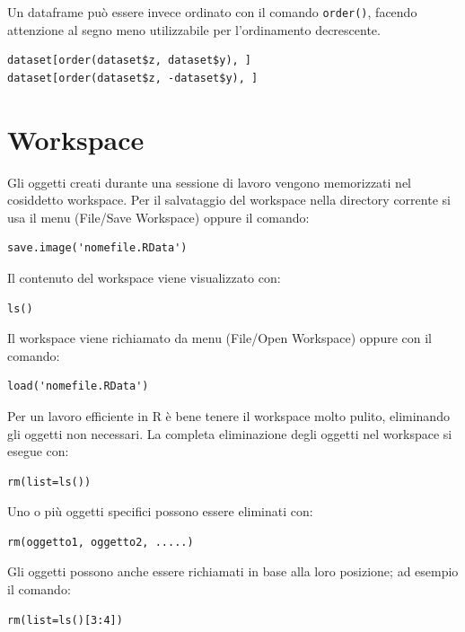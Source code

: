 \documentclass[a4paper,12pt,oneside]{book}
\begin{document}
Un dataframe può essere invece ordinato con il comando \texttt{order()}, facendo attenzione al segno meno utilizzabile per l'ordinamento decrescente.

\begin{verbatim}
dataset[order(dataset$z, dataset$y), ]
dataset[order(dataset$z, -dataset$y), ]
\end{verbatim}

\hypertarget{workspace}{%
\section*{Workspace}\label{workspace}}

Gli oggetti creati durante una sessione di lavoro vengono memorizzati nel cosiddetto workspace. Per il salvataggio del workspace nella directory corrente si usa il menu (File/Save Workspace) oppure il comando:

\begin{verbatim}
save.image('nomefile.RData')
\end{verbatim}

Il contenuto del workspace viene visualizzato con:

\begin{verbatim}
ls()
\end{verbatim}

Il workspace viene richiamato da menu (File/Open Workspace) oppure con il comando:

\begin{verbatim}
load('nomefile.RData')
\end{verbatim}

Per un lavoro efficiente in R è bene tenere il workspace molto pulito, eliminando gli oggetti non necessari. La completa eliminazione degli oggetti nel workspace si esegue con:

\begin{verbatim}
rm(list=ls())
\end{verbatim}

Uno o più oggetti specifici possono essere eliminati con:

\begin{verbatim}
rm(oggetto1, oggetto2, .....)
\end{verbatim}

Gli oggetti possono anche essere richiamati in base alla loro posizione; ad esempio il comando:

\begin{verbatim}
rm(list=ls()[3:4])
\end{verbatim}
\end{document}

